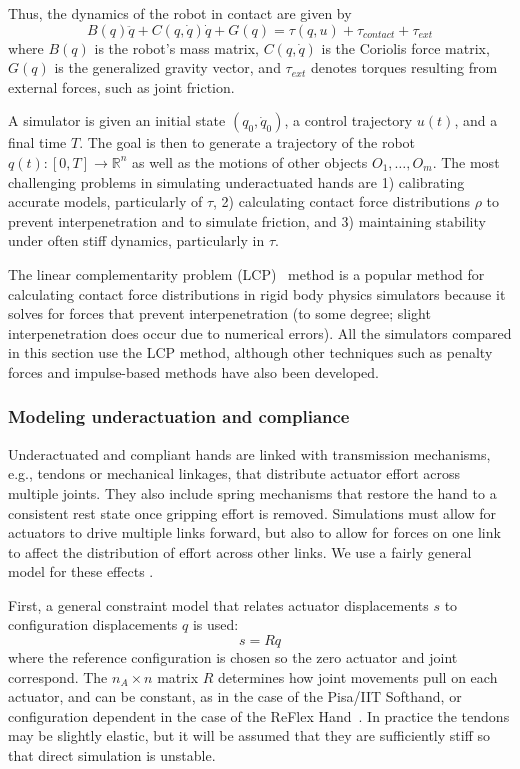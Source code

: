 Thus, the dynamics of the robot in contact are given by
\begin{equation}
\label{eq:Dynamics}
B(q)\ddot{q} + C(q,\dot{q})\dot{q} + G(q) = \tau(q,u) + \tau_{contact} + \tau_{ext}
\end{equation}
where $B(q)$ is the robot's mass matrix, $C(q,\dot{q})$ is the Coriolis force matrix, $G(q)$ is the generalized gravity vector, and $\tau_{ext}$ denotes torques resulting from external forces, such as joint friction.

A simulator is given an initial state $(q_0,\dot{q}_0)$, a control trajectory $u(t)$, and a final time $T$.  The goal is then to generate a trajectory of the robot $q(t):[0,T]\rightarrow \mathbb{R}^n$ as well as the motions of other objects $O_1,\ldots,O_m$. The most challenging problems in simulating underactuated hands are 1) calibrating accurate models, particularly of $\tau$, 2) calculating contact force distributions $\rho$ to prevent interpenetration and to simulate friction, and 3) maintaining stability under often stiff dynamics, particularly in $\tau$.

The linear complementarity problem (LCP)~\cite{Anitescu97} method is a popular method for calculating contact force distributions in rigid body physics simulators because it solves for forces that prevent interpenetration (to some degree; slight interpenetration does occur due to numerical errors).  All the simulators compared in this section use the LCP method, although other techniques such as penalty forces and impulse-based methods have also been developed.


\subsubsection{Modeling underactuation and compliance}

Underactuated and compliant hands are linked with transmission mechanisms, e.g., tendons or mechanical linkages, that distribute actuator effort across multiple joints. They also include spring mechanisms that restore the hand to a consistent rest state once gripping effort is removed.  Simulations must allow for actuators to drive multiple links forward, but also to allow for forces on one link to affect the distribution of effort across other links. We use a fairly general model for these effects \cite{Grioli12}.

First, a general constraint model that relates actuator displacements $s$ to configuration displacements $q$ is used:
\begin{equation}
\label{eq:quasi_static_equilibrium_0}
s = R q
\end{equation}
where the reference configuration is chosen so the zero actuator and joint correspond. The $n_A \times n$ matrix $R$ determines how joint movements pull on each actuator, and can be constant, as in the case of the Pisa/IIT Softhand, or configuration dependent in the case of the ReFlex Hand~\cite{Birglen11}.  In practice the tendons may be slightly elastic, but it will be assumed that they are sufficiently stiff so that direct simulation is unstable. 

